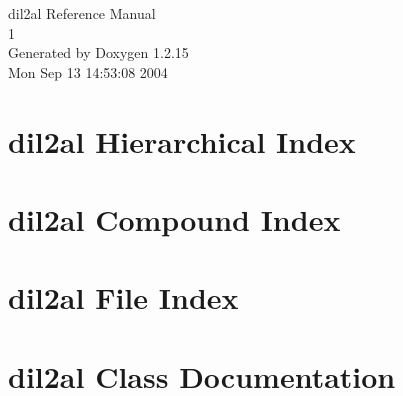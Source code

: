 \documentclass[a4paper]{book}
\begin{document}
\begin{titlepage}
\vspace*{7cm}
\begin{center}
{\Large dil2al Reference Manual\\[1ex]\large 1}\\
\vspace*{1cm}
{\large Generated by Doxygen 1.2.15}\\
\vspace*{0.5cm}
{\small Mon Sep 13 14:53:08 2004}\\
\end{center}
\end{titlepage}
\clearemptydoublepage
{}
\tableofcontents
\clearemptydoublepage
{}
\chapter{dil2al Hierarchical Index}

\chapter{dil2al Compound Index}

\chapter{dil2al File Index}

\chapter{dil2al Class Documentation}













































\end{document}
